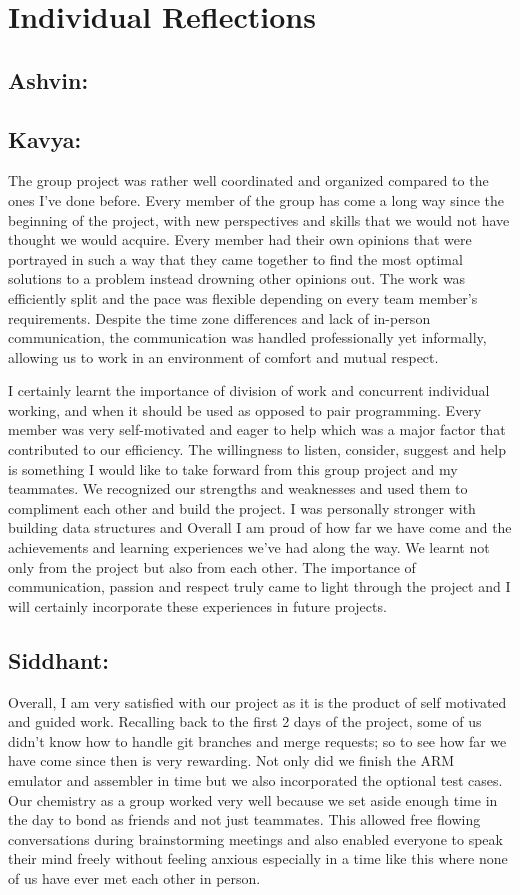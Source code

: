 \documentclass[a4paper]{article}
\begin{document}
\section{Individual Reflections}
\subsection{Ashvin:}
\lipsum[1-1]
\subsection{Kavya:}
The group project was rather well coordinated and organized compared to the ones I've done before. Every member of the group has come a long way since the beginning of the project, with new perspectives and skills that we would not have thought we would acquire. Every member had their own opinions that were portrayed in such a way that they came together to find the most optimal solutions to a problem instead drowning other opinions out. The work was efficiently split and the pace was flexible depending on every team member's requirements. Despite the time zone differences and lack of in-person communication, the communication was handled professionally yet informally, allowing us to work in an environment of comfort and mutual respect.

I certainly learnt the importance of division of work and concurrent individual working, and when it should be used as opposed to pair programming. Every member was very self-motivated and eager to help which was a major factor that contributed to our efficiency. The willingness to listen, consider, suggest and help is something I would like to take forward from this group project and my teammates.  We recognized our strengths and weaknesses and used them to compliment each other and build the project. I was personally stronger with building data structures and Overall I am proud of how far we have come and the achievements and learning experiences we've had along the way. We learnt not only from the project but also from each other. The importance of communication, passion and respect truly came to light through the project and I will certainly incorporate these experiences in future projects.

\subsection{Siddhant:}
Overall, I am very satisfied with our project as it is the product of self motivated and guided work. Recalling back to the first 2 days of the project, some of us didn't know how to handle git branches and merge requests; so to see how far we have come since then is very rewarding. Not only did we finish the ARM emulator and assembler in time but we also incorporated the optional test cases. Our chemistry as a group worked very well because we set aside enough time in the day to bond as friends and not just teammates. This allowed free flowing conversations during brainstorming meetings and also enabled everyone to speak their mind freely without feeling anxious especially in a time like this where none of us have ever met each other in person.
\end{document}
